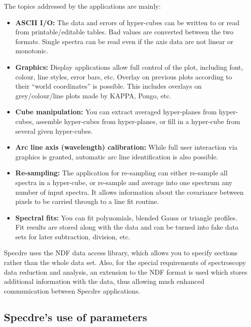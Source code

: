 \documentclass[11pt,twoside]{article}
\newcommand{\htmlref}[2]{#1}
\newcommand{\xref}[3]{#1}
\newcommand{\xlabel}[1]{}
\begin{document}
   The topics addressed by the applications are mainly:

\begin{itemize}
\item {\bf ASCII I/O:} The data and errors of hyper-cubes can be written
   to or read from printable/editable tables. Bad values are converted
   between the two formats. Single spectra can be read even if the axis
   data are not linear or monotonic.
\item {\bf Graphics:} Display applications allow full control of
   the plot, including font, colour, line styles, error bars, etc.
   Overlay on previous plots according to their ``world coordinates'' is
   possible. This includes overlays on grey/colour/line plots made by
   \xref{KAPPA}{sun95}{}, \xref{Pongo}{sun137}{}, etc.
\item {\bf Cube manipulation:} You can extract averaged hyper-planes
   from hyper-cubes, assemble hyper-cubes from hyper-planes, or fill in
   a hyper-cube from several given hyper-cubes.
\item {\bf Arc line axis (wavelength) calibration:} While full user
   interaction via graphics is granted, automatic arc line
   identification is also possible.
\item {\bf Re-sampling:} The application for re-sampling can either
   re-sample all spectra in a hyper-cube, or re-sample and average into
   one spectrum any number of input spectra. It allows information about
   the covariance between pixels to be carried through to a line fit
   routine.
\item {\bf Spectral fits:} You can fit polynomials, blended Gauss or
   triangle profiles. Fit results are stored along with the data and can
   be turned into fake data sets for later subtraction, division, etc.
\end{itemize}

   Specdre uses the \xref{NDF data access library}{sun33}{},
   which allows you to \htmlref{specify sections}{slice}
   rather than the whole data set. Also, for the special requirements of
   spectroscopy data reduction and analysis, an
   \htmlref{extension to the NDF format}{specdreextens}
   is used which stores additional information with the data, thus
   allowing much enhanced communication between Specdre applications.


\subsection{\label{specdreparams}\xlabel{specdreparams}Specdre's use of parameters}
\end{document}
